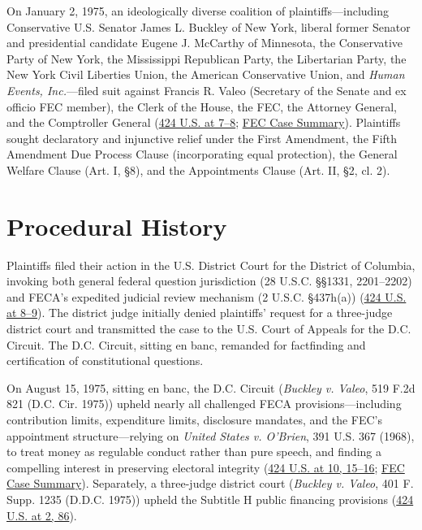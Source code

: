 \documentclass[12pt]{article}
\begin{document}
On January 2, 1975, an ideologically diverse coalition of plaintiffs---including Conservative U.S. Senator James L. Buckley of New York, liberal former Senator and presidential candidate Eugene J. McCarthy of Minnesota, the Conservative Party of New York, the Mississippi Republican Party, the Libertarian Party, the New York Civil Liberties Union, the American Conservative Union, and \textit{Human Events, Inc.}---filed suit against Francis R. Valeo (Secretary of the Senate and ex officio FEC member), the Clerk of the House, the FEC, the Attorney General, and the Comptroller General (\href{https://supreme.justia.com/cases/federal/us/424/1/}{424 U.S. at 7--8}; \href{https://www.fec.gov/legal-resources/court-cases/buckley-v-valeo/}{FEC Case Summary}). Plaintiffs sought declaratory and injunctive relief under the First Amendment, the Fifth Amendment Due Process Clause (incorporating equal protection), the General Welfare Clause (Art. I, \S 8), and the Appointments Clause (Art. II, \S 2, cl. 2).

\section{Procedural History}

Plaintiffs filed their action in the U.S. District Court for the District of Columbia, invoking both general federal question jurisdiction (28 U.S.C. \S\S 1331, 2201--2202) and FECA's expedited judicial review mechanism (2 U.S.C. \S 437h(a)) (\href{https://supreme.justia.com/cases/federal/us/424/1/}{424 U.S. at 8--9}). The district judge initially denied plaintiffs' request for a three-judge district court and transmitted the case to the U.S. Court of Appeals for the D.C. Circuit. The D.C. Circuit, sitting en banc, remanded for factfinding and certification of constitutional questions.

On August 15, 1975, sitting en banc, the D.C. Circuit (\textit{Buckley v. Valeo}, 519 F.2d 821 (D.C. Cir. 1975)) upheld nearly all challenged FECA provisions---including contribution limits, expenditure limits, disclosure mandates, and the FEC's appointment structure---relying on \textit{United States v. O'Brien}, 391 U.S. 367 (1968), to treat money as regulable conduct rather than pure speech, and finding a compelling interest in preserving electoral integrity (\href{https://supreme.justia.com/cases/federal/us/424/1/}{424 U.S. at 10, 15--16}; \href{https://www.fec.gov/legal-resources/court-cases/buckley-v-valeo/}{FEC Case Summary}). Separately, a three-judge district court (\textit{Buckley v. Valeo}, 401 F. Supp. 1235 (D.D.C. 1975)) upheld the Subtitle H public financing provisions (\href{https://supreme.justia.com/cases/federal/us/424/1/}{424 U.S. at 2, 86}).
\end{document}
